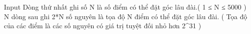 Input
Dòng thứ nhất ghi số N là số điểm có thể đặt góc lâu đài.( 1 ≤ N ≤ 5000 )
\\N dòng sau ghi 2*N số nguyên là tọa độ N điểm có thể đặt góc lâu đài. ( Tọa độ của các điểm là các số nguyên có giá trị tuyệt đối nhỏ hơn 2^31 )